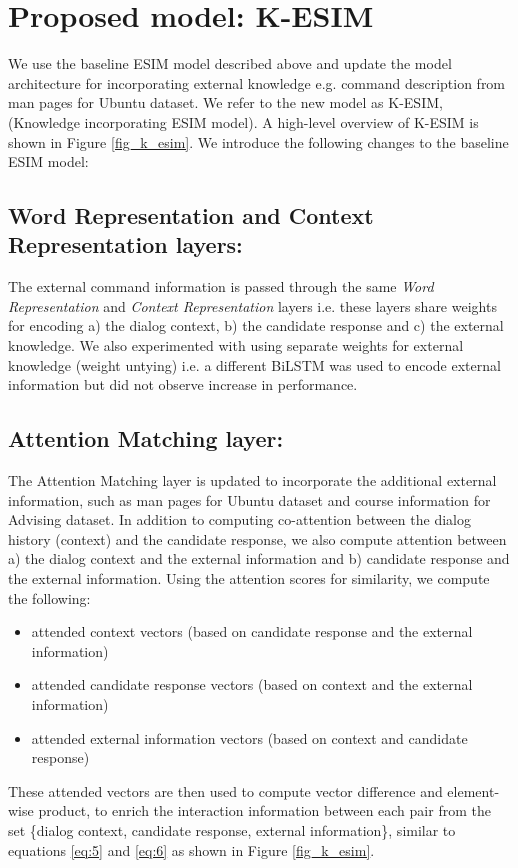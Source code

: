 \documentclass[letterpaper]{article} %
\begin{document}
\section{Proposed model: K-ESIM}
\label{proposed-model-k-esim}
We use the baseline ESIM model described above and update the model architecture for incorporating external knowledge e.g. command description from man pages for Ubuntu dataset. We refer to the new model as K-ESIM, (Knowledge incorporating ESIM model). A high-level overview of K-ESIM is shown in Figure \ref{fig_k_esim}. We introduce the following changes to the baseline ESIM model:

\subsection{Word Representation and Context Representation layers:}
The external command information is passed through the same \textit{Word Representation} and \textit{Context Representation} layers i.e. these layers share weights for encoding a) the dialog context, b) the candidate response and c) the external knowledge. We also experimented with using separate weights for external knowledge (weight untying) i.e. a different BiLSTM was used to encode external information but did not observe increase in performance.

\subsection{Attention Matching layer:}
The Attention Matching layer is updated to incorporate the additional external information, such as man pages for Ubuntu dataset and course information for Advising dataset. In addition to computing co-attention between the dialog history (context) and the candidate response, we also compute attention between a) the dialog context and the external information and b) candidate response and the external information. Using the attention scores for similarity, we compute the following:
\begin{itemize}
\item attended context vectors (based on candidate response and the external information)
\item attended candidate response vectors (based on context and the external information)
\item attended external information vectors (based on context and candidate response)
\end{itemize}
These attended vectors are then used to compute vector difference and element-wise product, to enrich the interaction information between each pair from the set \{dialog context, candidate response, external information\}, similar to equations \ref{eq:5} and \ref{eq:6} as shown in Figure \ref{fig_k_esim}.
\end{document}
